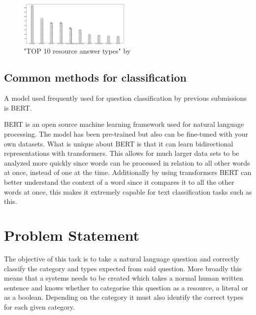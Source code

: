 \documentclass[sigconf]{acmart}
\begin{document}
\begin{figure}[h]
    \includegraphics[width=0.48\textwidth]{figures/top10ResourceAnswerTypes.png}
    \caption{"TOP 10 resource answer types" by \citet{Kothen:analysis}}
    \label{figure:top10resourceanswertypes}
\end{figure}

\subsection{Common methods for classification}
A model used frequently used for question classification by previous submissions is \gls{BERT}\cite{maastricht:bert, heraklion:bert, tokyo:bert, uis:bert, Kothen:analysis}. 

\gls{BERT} is an open source machine learning framework used for natural language processing. The model has been pre-trained but also can be fine-tuned with your own datasets. What is unique about BERT is that it can learn bidirectional representations with transformers. This allows for much larger data sets to be analyzed more quickly since words can be processed in relation to all other words at once, instead of one at the time. Additionally by using transformers \gls{BERT} can better understand the context of a word since it compares it to all the other words at once, this makes it extremely capable for text classification tasks such as this.\cite{nvidia:bert}



\section{Problem Statement}

The objective of this task is to take a natural language question and correctly classify the category and types expected from said question. More broadly this means that a systems needs to be created which takes a normal human written sentence and knows whether to categorise this question as a resource, a literal or as a boolean. Depending on the category it must also identify the correct types for each given category. 
\end{document}
